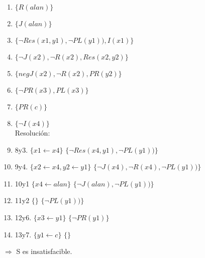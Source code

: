 \documentclass[10pt,a4paper]{article}
\begin{document}
\begin{enumerate}
\item $\{R(alan)\}$
\item $\{J(alan)\}$
\item $\{ \neg Res(x1,y1), \neg PL(y1)), I(x1) \}$
\item $\{\neg J(x2), \neg R(x2), Res(x2,y2)\}$
\item $\{neg J(x2), \neg R(x2), PR(y2)\}$
\item $\{\neg PR(x3), PL(x3)\}$
\item $\{PR(c)\}$
\item $\{\neg I(x4)\}$ \\
Resolución:
\item 8y3. $\{x1 \leftarrow x4\}$ $\{\neg Res(x4,y1), \neg PL(y1))\}$
\item 9y4. $\{x2 \leftarrow x4, y2 \leftarrow y1\}$ $\{\neg J(x4), \neg R(x4), \neg PL(y1))\}$
\item 10y1 $\{x4 \leftarrow alan\}$ $\{\neg J(alan), \neg PL(y1))\}$
\item 11y2 $\{\}$ $\{\neg PL(y1))\}$
\item 12y6. $\{x3 \leftarrow y1\}$ $\{\neg PR(y1)\}$
\item 13y7. $\{y1 \leftarrow c\}$ $\{\}$
\end{enumerate}
$\Rightarrow$ S es insatisfacible.
\end{document}
